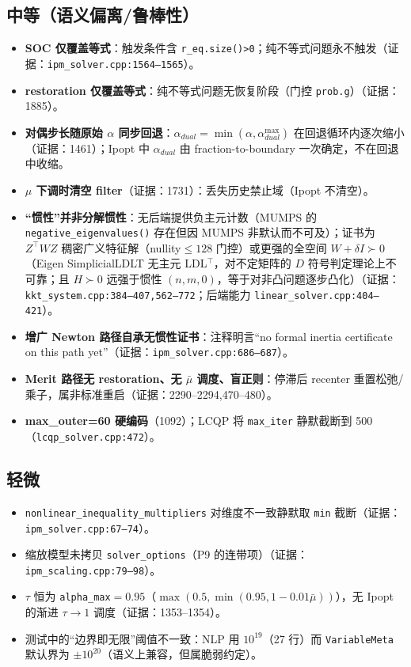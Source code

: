 \documentclass[11pt,a4paper]{ctexart}
\newcommand{\file}[1]{\texttt{#1}}
\newcommand{\func}[1]{\texttt{#1}}
\newcommand{\opt}[1]{\texttt{#1}}
\newcommand{\evid}[1]{{\footnotesize\color{black!70}（证据：#1）}}
\begin{document}
\subsection{中等（语义偏离/鲁棒性）}
\begin{itemize}[leftmargin=2em]
  \item \textbf{SOC 仅覆盖等式}：触发条件含 \opt{r\_eq.size()>0}；纯不等式问题永不触发\evid{\file{ipm\_solver.cpp:1564--1565}}。
  \item \textbf{restoration 仅覆盖等式}：纯不等式问题无恢复阶段（门控 \opt{prob.g}）\evid{1885}。
  \item \textbf{对偶步长随原始 $\alpha$ 同步回退}：$\alpha_{dual}=\min(\alpha,\alpha_{dual}^{\max})$ 在回退循环内逐次缩小\evid{1461}；Ipopt 中 $\alpha_{dual}$ 由 fraction-to-boundary 一次确定，不在回退中收缩。
  \item \textbf{$\mu$ 下调时清空 filter}\evid{1731}：丢失历史禁止域（Ipopt 不清空）。
  \item \textbf{``惯性''并非分解惯性}：无后端提供负主元计数（MUMPS 的 \func{negative\_eigenvalues()} 存在但因 MUMPS 非默认而不可及）；证书为 $Z^{\top}WZ$ 稠密广义特征解（nullity$\le 128$ 门控）或更强的全空间 $W+\delta I\succ 0$（Eigen SimplicialLDLT 无主元 LDL$^{\top}$，对不定矩阵的 $D$ 符号判定理论上不可靠；且 $H\succ 0$ 远强于惯性 $(n,m,0)$，等于对非凸问题逐步凸化）\evid{\file{kkt\_system.cpp:384--407,562--772}；后端能力 \file{linear\_solver.cpp:404--421}}。
  \item \textbf{增广 Newton 路径自承无惯性证书}：注释明言``no formal inertia certificate on this path yet''\evid{\file{ipm\_solver.cpp:686--687}}。
  \item \textbf{Merit 路径无 restoration、无 $\bar\mu$ 调度、盲正则}：停滞后 recenter 重置松弛/乘子，属非标准重启\evid{2290--2294,470--480}。
  \item \textbf{max\_outer=60 硬编码}（1092）；LCQP 将 \opt{max\_iter} 静默截断到 500（\file{lcqp\_solver.cpp:472}）。
\end{itemize}

\subsection{轻微}
\begin{itemize}[leftmargin=2em]
  \item \func{nonlinear\_inequality\_multipliers} 对维度不一致静默取 \texttt{min} 截断\evid{\file{ipm\_solver.cpp:67--74}}。
  \item 缩放模型未拷贝 \opt{solver\_options}（P9 的连带项）\evid{\file{ipm\_scaling.cpp:79--98}}。
  \item $\tau$ 恒为 \opt{alpha\_max}${=}0.95$（$\max(0.5,\min(0.95,1-0.01\bar\mu))$），无 Ipopt 的渐进 $\tau\to 1$ 调度\evid{1353--1354}。
  \item 测试中的``边界即无限''阈值不一致：NLP 用 $10^{19}$（27 行）而 \func{VariableMeta} 默认界为 $\pm 10^{20}$（语义上兼容，但属脆弱约定）。
\end{itemize}
\end{document}

